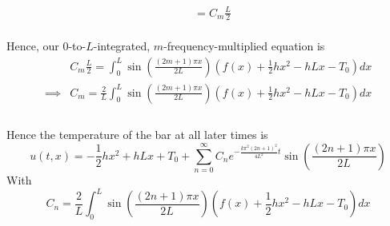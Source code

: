 \documentclass[12pt]{article}
\begin{document}
{\begin{align*}
&= C_m \frac{L}{2}
\end{align*} \\
Hence, our $0$-to-$L$-integrated, $m$-frequency-multiplied equation is 
\begin{align*}
& C_m \frac{L}{2} = \int_0^L \sin \left( \frac{(2m+1)\pi x}{2L}  \right) \left( f(x) + \frac{1}{2} h x^2 - hLx - T_0 \right) dx \\
\implies& C_m = \frac{2}{L} \int_0^L \sin \left( \frac{(2m+1)\pi x}{2L}  \right) \left( f(x) + \frac{1}{2} h x^2 - hLx - T_0 \right) dx \\
\end{align*} \\
Hence the temperature of the bar at all later times is \\
$$\boxed{u(t,x) = -\frac{1}{2} h x^2 + hLx + T_0 + \sum_{n=0}^{\infty} C_n e^{- \frac{k \pi^2  \left(2n + 1 \right)^2}{4L^2} t} \sin \left( \frac{(2n+1)\pi x}{2L} \right)}$$
With $$\boxed{C_n = \frac{2}{L} \int_0^L \sin \left( \frac{(2n+1)\pi x}{2L}  \right) \left( f(x) + \frac{1}{2} h x^2 - hLx - T_0 \right) dx}$$
}
\vspace{0.3in}
\end{document}
